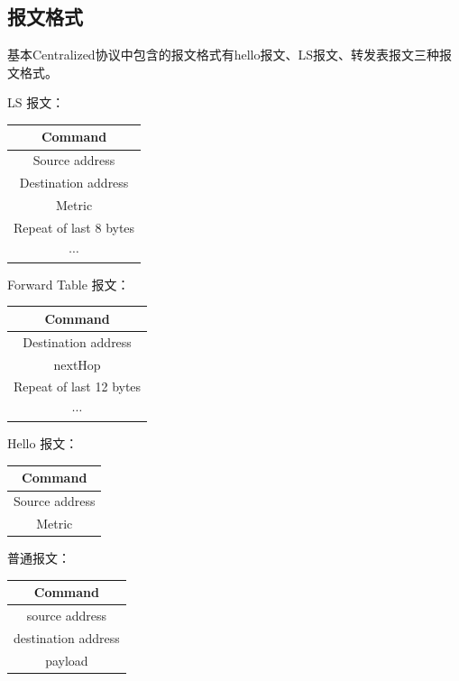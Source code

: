	\subsection{报文格式} %
	\label{sub:报文格式}
		基本Centralized协议中包含的报文格式有hello报文、LS报文、转发表报文三种报文格式。
		\par LS 报文：
		\begin{table}[H]
		\centering
			\begin{tabular}{|c|}
				\hline
				Command \\
				\hline
				Source address \\
				\hline
				Destination address \\
				\hline
				Metric \\
				\hline
				Repeat of last 8 bytes \\
				\hline
				$\cdots$ \\
				\hline
			\end{tabular}		
		\end{table}
		\par Forward Table 报文：
		\begin{table}[H]
		\centering
			\begin{tabular}{|c|}
				\hline
				Command \\
				\hline
				Destination address \\
				\hline
				nextHop \\
				\hline
				Repeat of last 12 bytes \\
				\hline
				$\cdots$ \\
				\hline
			\end{tabular}		
		\end{table}
		\par Hello 报文：
		\begin{table}[H]
		\centering
			\begin{tabular}{|c|}
				\hline
				Command        \\
				\hline
				Source address \\
				\hline
				Metric         \\
				\hline
			\end{tabular}
		\end{table}
		\par 普通报文：
		\begin{table}[H]
		\centering
			\begin{tabular}{|c|}
				\hline
				Command \\
				\hline
				source address \\
				\hline
				destination address \\
				\hline
				payload \\
				\hline
			\end{tabular}		
		\end{table}
